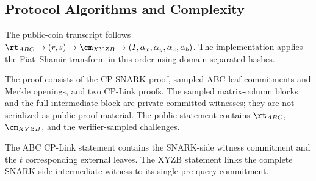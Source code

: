 


\subsection{Protocol Algorithms and Complexity}
\label{sec:protocol-complexity}
The public-coin transcript follows
\(\rt_{ABC}\rightarrow(r,s)\rightarrow\cm_{XYZB}\rightarrow
(I,\alpha_x,\alpha_y,\alpha_z,\alpha_b)\).
The implementation applies the Fiat--Shamir transform in this order using
domain-separated hashes.

The proof consists of the CP-SNARK proof, sampled ABC leaf commitments and
Merkle openings, and two CP-Link proofs.  The sampled matrix-column blocks and
the full intermediate block are private committed witnesses; they are not
serialized as public proof material.  The public statement contains
\(\rt_{ABC}\), \(\cm_{XYZB}\), and the verifier-sampled challenges.

The ABC CP-Link statement contains the SNARK-side witness commitment and the
\(t\) corresponding external leaves.  The XYZB statement links the complete
SNARK-side intermediate witness to its single pre-query commitment.


